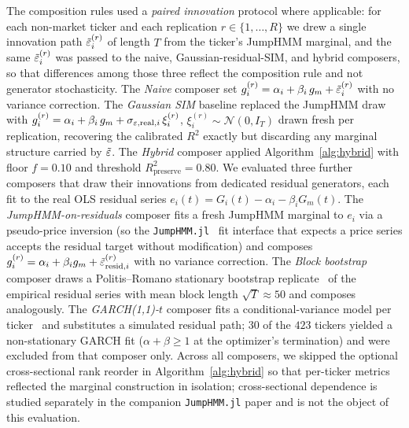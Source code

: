The composition rules used a \emph{paired innovation} protocol
where applicable: for each non-market ticker and each replication
$r \in \{1, \dots, R\}$ we drew a single innovation path
$\tilde{\varepsilon}_i^{(r)}$ of length $T$ from the ticker's JumpHMM marginal,
and the same $\tilde{\varepsilon}_i^{(r)}$ was passed to the naive,
Gaussian-residual-SIM, and hybrid composers, so that differences
among those three reflect the composition rule and not generator
stochasticity. The \emph{Naive} composer set
$g_i^{(r)} = \alpha_i + \beta_i\, g_m + \tilde{\varepsilon}_i^{(r)}$ with no
variance correction. The \emph{Gaussian SIM} baseline replaced the
JumpHMM draw with
$g_i^{(r)} = \alpha_i + \beta_i\, g_m + \sigma_{\varepsilon,\mathrm{real},i}\,\xi_i^{(r)}$,
$\xi_i^{(r)} \sim \mathcal{N}(0, I_T)$ drawn fresh per replication,
recovering the calibrated $R^2$ exactly but discarding any marginal
structure carried by $\tilde{\varepsilon}$. The \emph{Hybrid} composer applied
Algorithm~\ref{alg:hybrid} with floor $f = 0.10$ and threshold
$R^2_{\mathrm{preserve}} = 0.80$. We evaluated three further
composers that draw their innovations from dedicated residual
generators, each fit to the real OLS residual series
$e_i(t) = G_i(t) - \alpha_i - \beta_i G_m(t)$. The
\emph{JumpHMM-on-residuals} composer fits a fresh JumpHMM marginal
to $e_i$ via a pseudo-price inversion (so the
\texttt{JumpHMM.jl}~\cite{alswaidanVarner2026jdiq} fit interface
that expects a price series accepts the residual target without
modification) and composes
$g_i^{(r)} = \alpha_i + \beta_i g_m + \tilde{\varepsilon}_{\mathrm{resid},i}^{(r)}$
with no variance correction. The \emph{Block bootstrap} composer
draws a Politis--Romano stationary bootstrap
replicate~\cite{politisRomano1994} of the empirical residual series
with mean block length $\sqrt{T} \approx 50$ and composes
analogously. The \emph{GARCH(1,1)-$t$} composer fits a
conditional-variance model per ticker~\cite{bollerslev1986} and
substitutes a simulated residual path; $30$ of the $423$ tickers
yielded a non-stationary GARCH fit ($\alpha + \beta \ge 1$ at the
optimizer's termination) and were excluded from that composer only. Across all composers, we
skipped the optional cross-sectional rank reorder in
Algorithm~\ref{alg:hybrid} so that per-ticker metrics reflected the
marginal construction in isolation; cross-sectional dependence is
studied separately in the companion \texttt{JumpHMM.jl} paper and
is not the object of this evaluation.

